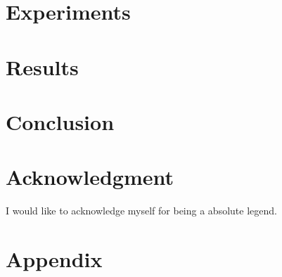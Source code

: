 \documentclass[conference]{IEEEtran}
\begin{document}
\section{Experiments}

\section{Results}

\section{Conclusion}


\section*{Acknowledgment}

I would like to acknowledge myself for being a absolute legend.





\section*{Appendix}
\end{document}
